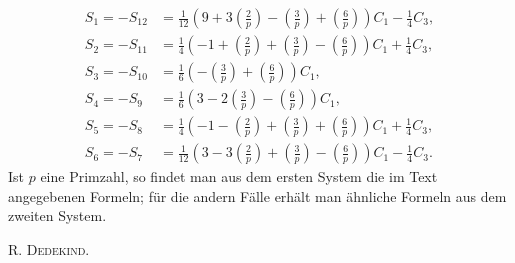 \documentclass[12pt]{article}
\begin{document}
\[
\begin{aligned}
S_1=-S_{12}&=\frac1{12}\left(9+3\left(\frac2p\right)-\left(\frac3p\right)+\left(\frac6p\right)\right)C_1-\frac14C_3,\\
S_2=-S_{11}&=\frac14\left(-1+\left(\frac2p\right)+\left(\frac3p\right)-\left(\frac6p\right)\right)C_1+\frac14C_3,\\
S_3=-S_{10}&=\frac16\left(-\left(\frac3p\right)+\left(\frac6p\right)\right)C_1,\\
S_4=-S_9&=\frac16\left(3-2\left(\frac3p\right)-\left(\frac6p\right)\right)C_1,\\
S_5=-S_8&=\frac14\left(-1-\left(\frac2p\right)+\left(\frac3p\right)+\left(\frac6p\right)\right)C_1+\frac14C_3,\\
S_6=-S_7&=\frac1{12}\left(3-3\left(\frac2p\right)+\left(\frac3p\right)-\left(\frac6p\right)\right)C_1-\frac14C_3.
\end{aligned}
\]
Ist \(p\) eine Primzahl, so findet man aus dem ersten System die im Text angegebenen Formeln; für die andern Fälle erhält man ähnliche Formeln aus dem zweiten System.

\begin{flushright}
R. \textsc{Dedekind}.
\end{flushright}
\end{document}
